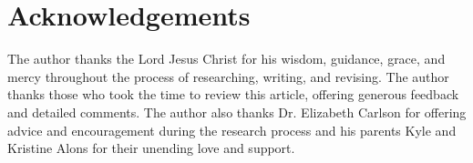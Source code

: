 \documentclass{article}
\theoremstyle{plain}
\theoremstyle{definition}
\theoremstyle{remark}
\begin{document}
\section*{Acknowledgements}%
The author thanks the Lord Jesus Christ for his wisdom, guidance, grace, and mercy throughout the process of researching, writing, and revising. The author thanks those who took the time to review this article, offering generous feedback and detailed comments. The author also thanks Dr. Elizabeth Carlson for offering advice and encouragement during the research process and his parents Kyle and Kristine Alons for their unending love and support.

\newpage



\end{document}
